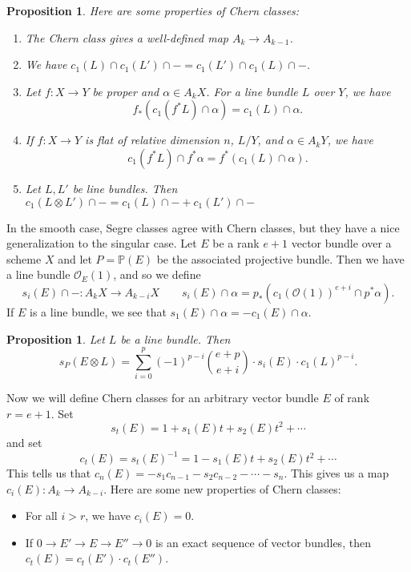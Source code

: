 \documentclass[leqno, openany]{memoir}
\newtheorem{prop}[thm]{Proposition}
\theoremstyle{definition}
\theoremstyle{remark}
\theoremstyle{plain}
\theoremstyle{definition}
\theoremstyle{remark}
\renewcommand{\P}{\mathbb{P}}
\newcommand{\msc}[1]{\mathscr{#1}}
\begin{document}
\begin{prop}
    Here are some properties of Chern classes:
    \begin{enumerate}
        \item The Chern class gives a well-defined map $A_k \to A_{k-1}$.
        \item We have $c_1(L) \cap c_1(L') \cap - = c_1(L') \cap c_1(L) \cap -$.
        \item Let $f \colon X \to Y$ be proper and $\alpha \in A_k X$. For a line bundle $L$ over $Y$, we have
            \[ f_* (c_1(f^* L) \cap \alpha) = c_1(L) \cap \alpha. \]
        \item If $f \colon X \to Y$ is flat of relative dimension $n$, $L/Y$, and $\alpha \in A_k Y$, we have
            \[ c_1(f^* L) \cap f^* \alpha = f^*(c_1(L) \cap \alpha). \]
        \item Let $L, L'$ be line bundles. Then $c_1(L \otimes L') \cap - = c_1(L) \cap - + c_1(L') \cap -$
    \end{enumerate}
\end{prop}

In the smooth case, Segre classes agree with Chern classes, but they have a nice generalization to the singular case. Let $E$ be a rank $e+1$ vector bundle over a scheme $X$ and let $P = \P(E)$ be the associated projective bundle. Then we have a line bundle $\msc{O}_E(1)$, and so we define
\[ s_i(E) \cap - \colon A_k X \to A_{k-i} X \qquad s_i(E) \cap \alpha = p_* (c_1 { (\msc{O}(1)) }^{e+i} \cap p^* \alpha ). \]
If $E$ is a line bundle, we see that $s_1(E) \cap \alpha = - c_1(E) \cap \alpha$. 

\begin{prop}
    Let $L$ be a line bundle. Then 
    \[ s_P(E \otimes L) = \sum_{i=0}^p {(-1)}^{p-i} \binom{e+p}{e+i} \cdot s_i(E) \cdot {c_1(L)}^{p-i}. \]
\end{prop}

Now we will define Chern classes for an arbitrary vector bundle $E$ of rank $r = e+1$. Set
\[ s_t(E) = 1 + s_1(E) t + s_2(E) t^2 + \cdots \]
and set 
\[ c_t(E) = { s_t(E) }^{-1} = 1 - s_1(E) t + s_2(E) t^2 + \cdots \]
This tells us that $c_n(E) = - s_1 c_{n-1} - s_2 c_{n-2} - \cdots - s_n$. This gives us a map $c_i(E) \colon A_k \to A_{k-i}$. Here are some new properties of Chern classes:
\begin{itemize}
    \item For all $i > r$, we have $c_i(E) = 0$.
    \item If $0 \to E' \to E \to E'' \to 0$ is an exact sequence of vector bundles, then $c_t(E) = c_t(E') \cdot c_t(E'')$.
\end{itemize}
\end{document}
